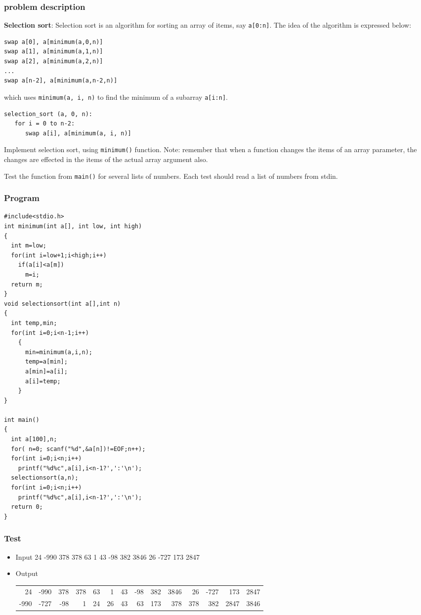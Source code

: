 \documentclass[11pt]{article}
\begin{document}
\subsubsection*{problem description}
\label{sec-2-1-1}
\textbf{Selection sort}: Selection sort is an algorithm for sorting an
  array of items, say \texttt{a[0:n]}. The idea of the algorithm is
  expressed below:
\linespread{1}
\begin{verbatim}
swap a[0], a[minimum(a,0,n)]
swap a[1], a[minimum(a,1,n)]
swap a[2], a[minimum(a,2,n)]
...
swap a[n-2], a[minimum(a,n-2,n)]
\end{verbatim}
which uses \texttt{minimum(a, i, n)} to find the minimum of a subarray
\texttt{a[i:n]}.
\begin{verbatim}
selection_sort (a, 0, n):
   for i = 0 to n-2:
      swap a[i], a[minimum(a, i, n)]
\end{verbatim}
\linespread{1.2}
Implement selection sort, using \texttt{minimum()} function. Note:
remember that when a function changes the items of an array
parameter, the changes are effected in the items of the actual
array argument also.

Test the function from \texttt{main()} for several lists of numbers. Each
test should read a list of numbers from stdin.
\subsubsection*{Program}
\label{sec-2-1-2}
\begin{verbatim}
#include<stdio.h>
int minimum(int a[], int low, int high)
{
  int m=low;
  for(int i=low+1;i<high;i++)
    if(a[i]<a[m])
      m=i;
  return m;
}
void selectionsort(int a[],int n)
{
  int temp,min;
  for(int i=0;i<n-1;i++)
    {
      min=minimum(a,i,n);
      temp=a[min];
      a[min]=a[i];
      a[i]=temp;
    }
}

int main()
{
  int a[100],n;
  for( n=0; scanf("%d",&a[n])!=EOF;n++);
  for(int i=0;i<n;i++)
    printf("%d%c",a[i],i<n-1?',':'\n');
  selectionsort(a,n);
  for(int i=0;i<n;i++)
    printf("%d%c",a[i],i<n-1?',':'\n');
  return 0;
}
\end{verbatim}
\subsubsection*{Test}
\label{sec-2-1-3}
\begin{itemize}
\item Input
\label{sec-2-1-3-1}
24 -990 378 378 63 1 43 -98 382 3846 26 -727 173 2847 
\item Output
\label{sec-2-1-3-2}
\begin{center}
\begin{tabular}{rrrrrrrrrrrrrr}
24 & -990 & 378 & 378 & 63 & 1 & 43 & -98 & 382 & 3846 & 26 & -727 & 173 & 2847\\
-990 & -727 & -98 & 1 & 24 & 26 & 43 & 63 & 173 & 378 & 378 & 382 & 2847 & 3846\\
\end{tabular}
\end{center}
\end{itemize}
\end{document}
